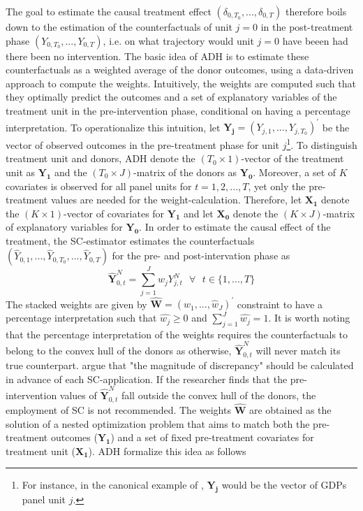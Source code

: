 The goal to estimate the causal treatment effect $(\delta_{0,T_0}, ..., \delta_{0,T})$ therefore boils down to the estimation of the counterfactuals of unit $j = 0$ in the post-treatment phase $(Y_{0,T_0}, ..., Y_{0,T})$, i.e. on what trajectory would unit $j=0$ have beeen had there been no intervention. The basic idea of \ac{ADH} is to estimate these counterfactuals as a weighted average of the donor outcomes, using a data-driven approach to compute the weights. Intuitively, the weights are computed such that they optimally predict the outcomes and a set of explanatory variables of the treatment unit in the pre-intervention phase, conditional on having a percentage interpretation. To operationalize this intuition, let $\boldsymbol{Y_j} = (Y_{j,1}, ..., Y_{j,T_0})^\prime$ be the vector of observed outcomes in the pre-treatment phase for unit $j$\footnote{For instance, in the canonical example of \cite{abadie:2003}, $\boldsymbol{Y_j}$ would be the vector of \ac{GDP}s panel unit $j$.}. To distinguish treatment unit and donors, \ac{ADH} denote the $(T_0 \times 1)$-vector of the treatment unit as $\boldsymbol{Y_1}$ and the $(T_0 \times J)$-matrix of the donors as $\boldsymbol{Y_0}$. Moreover, a set of $K$ covariates is observed for all panel units for $t = 1,2,...,T$, yet only the pre-treatment values are needed for the weight-calculation. Therefore, let $\boldsymbol{X_1}$ denote the $(K \times 1)$-vector of covariates for $\boldsymbol{Y_1}$ and let $\boldsymbol{X_0}$ denote the $(K \times J)$-matrix of explanatory variables for $\boldsymbol{Y_0}$. In order to estimate the causal effect of the treatment, the \ac{SC}-estimator estimates the counterfactuals $(\widehat{Y}_{0,1}, ...,\widehat{Y}_{0,T_0},..., \widehat{Y}_{0,T})$ for the pre- and post-intervation phase as 
\[
\widehat{\boldsymbol{Y}}^{N}_{0,t} = \sum_{j = 1}^{J} \widehat{w}_j Y^{N}_{j,t} \text{ } \forall \text{ } t \in \{1,...,T\}
\]
The stacked weights are given by $\boldsymbol{\widehat{W}} = (\widehat{w}_1, ... , \widehat{w}_J)^\prime$ constraint to have a percentage interpretation such that $\widehat{w_j} \geq 0$ and $\sum_{j = 1}^{J} \widehat{w_j} = 1$. It is worth noting that the percentage interpretation of the weights requires the counterfactuals to belong to the convex hull of the donors as otherwise, $\widehat{\boldsymbol{Y}}^{N}_{0,t}$ will never match its true counterpart. \cite{abadie:2010} argue that "the magnitude of discrepancy" should be calculated in advance of each \ac{SC}-application. If the researcher finds that the pre-intervention values of $\widehat{\boldsymbol{Y}}^{N}_{0,t}$ fall outside the convex hull of the donors, the employment of \ac{SC} is not recommended. The weights $\boldsymbol{\widehat{W}}$ are obtained as the solution of a nested optimization problem that aims to match both the pre-treatment outcomes ($\boldsymbol{Y_1}$) and a set of fixed pre-treatment covariates for treatment unit ($\boldsymbol{X_1}$). \ac{ADH} formalize this idea as follows
